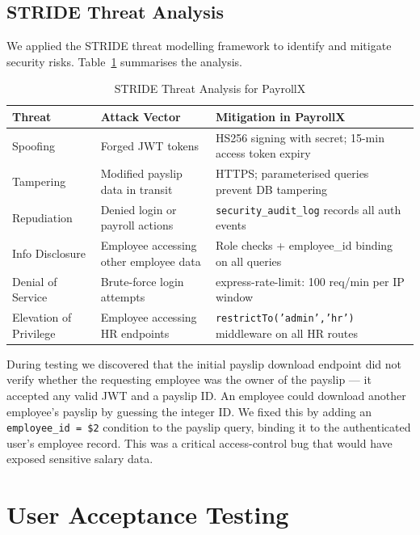 \documentclass[12pt,a4paper]{report}
\begin{document}
\subsection{STRIDE Threat Analysis}

We applied the STRIDE threat modelling framework to identify and mitigate security risks. Table~\ref{tab:stride} summarises the analysis.

\begin{table}[H]
\centering
\caption{STRIDE Threat Analysis for PayrollX}
\label{tab:stride}
\begin{tabular}{|p{2cm}|p{4cm}|p{5cm}|}
\hline
\textbf{Threat} & \textbf{Attack Vector} & \textbf{Mitigation in PayrollX} \\
\hline
Spoofing         & Forged JWT tokens & HS256 signing with secret; 15-min access token expiry \\
\hline
Tampering        & Modified payslip data in transit & HTTPS; parameterised queries prevent DB tampering \\
\hline
Repudiation      & Denied login or payroll actions & \texttt{security\_audit\_log} records all auth events \\
\hline
Info Disclosure  & Employee accessing other employee data & Role checks + employee\_id binding on all queries \\
\hline
Denial of Service & Brute-force login attempts & express-rate-limit: 100 req/min per IP window \\
\hline
Elevation of Privilege & Employee accessing HR endpoints & \texttt{restrictTo('admin','hr')} middleware on all HR routes \\
\hline
\end{tabular}
\end{table}

\begin{failbox}
During testing we discovered that the initial payslip download endpoint did not verify whether the requesting employee was the owner of the payslip --- it accepted any valid JWT and a payslip ID. An employee could download another employee's payslip by guessing the integer ID. We fixed this by adding an \texttt{employee\_id = \$2} condition to the payslip query, binding it to the authenticated user's employee record. This was a critical access-control bug that would have exposed sensitive salary data.
\end{failbox}

\section{User Acceptance Testing}
\end{document}
